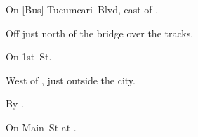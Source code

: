 
\begin{LocationList}

On [Bus] Tucumcari~Blvd, east of .

Off  just north of the bridge over the tracks.

On  1st~St.

West of , just outside the city.

\Location{\TruckStop \Gas \Rest \Weigh}
By  .

On  Main~St at .

\end{LocationList}
